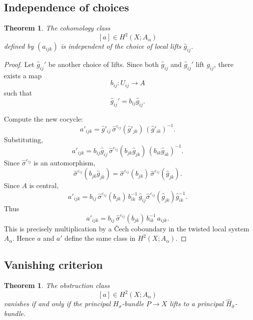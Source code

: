 \documentclass[11pt]{amsart}
\newtheorem{theorem}[definition]{Theorem}
\begin{document}
\subsection{Independence of choices}

\begin{theorem}
The cohomology class
\[
[a]\in H^2(X;A_\alpha)
\]
defined by \((a_{ijk})\) is independent of the choice of local lifts \(\widehat g_{ij}\).
\end{theorem}

\begin{proof}
Let \(\widehat g_{ij}'\) be another choice of lifts. Since both \(\widehat g_{ij}\) and \(\widehat g_{ij}'\) lift \(g_{ij}\), there exists a map
\[
b_{ij}:U_{ij}\to A
\]
such that
\[
\widehat g_{ij}'=b_{ij}\widehat g_{ij}.
\]

Compute the new cocycle:
\[
a'_{ijk}
=
\widehat g'_{ij}\,
\widehat\sigma^{\varepsilon_{ij}}(\widehat g'_{jk})\,
(\widehat g'_{ik})^{-1}.
\]
Substituting,
\[
a'_{ijk}
=
b_{ij}\widehat g_{ij}\,
\widehat\sigma^{\varepsilon_{ij}}(b_{jk}\widehat g_{jk})\,
(b_{ik}\widehat g_{ik})^{-1}.
\]
Since \(\widehat\sigma^{\varepsilon_{ij}}\) is an automorphism,
\[
\widehat\sigma^{\varepsilon_{ij}}(b_{jk}\widehat g_{jk})
=
\widehat\sigma^{\varepsilon_{ij}}(b_{jk})\,
\widehat\sigma^{\varepsilon_{ij}}(\widehat g_{jk}).
\]
Since \(A\) is central,
\[
a'_{ijk}
=
b_{ij}\,
\widehat\sigma^{\varepsilon_{ij}}(b_{jk})\,
b_{ik}^{-1}
\,
\widehat g_{ij}\widehat\sigma^{\varepsilon_{ij}}(\widehat g_{jk})\widehat g_{ik}^{-1}.
\]
Thus
\[
a'_{ijk}
=
b_{ij}\,
\widehat\sigma^{\varepsilon_{ij}}(b_{jk})\,
b_{ik}^{-1}
\,a_{ijk}.
\]
This is precisely multiplication by a Čech coboundary in the twisted local system \(A_\alpha\). Hence \(a\) and \(a'\) define the same class in \(H^2(X;A_\alpha)\).
\end{proof}

\subsection{Vanishing criterion}

\begin{theorem}
The obstruction class
\[
[a]\in H^2(X;A_\alpha)
\]
vanishes if and only if the principal \(H_\sigma\)-bundle \(P\to X\) lifts to a principal \(\widehat H_{\widehat\sigma}\)-bundle.
\end{theorem}
\end{document}
